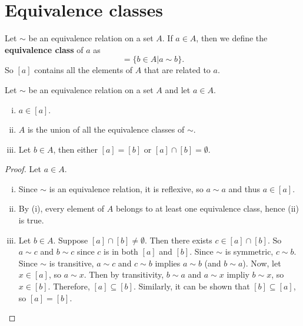 \documentclass[../abstract_algebra.tex]{subfiles}
\begin{document}
    \section{Equivalence classes}
        \begin{definition}
            Let $\sim$ be an equivalence relation on a set $A$.
            If $a\in A$, then we define the \textbf{equivalence class} of $a$ as
            \begin{equation}
                [a]=\{b\in A|a\sim b\}.
            \end{equation}
            So $[a]$ contains all the elements of $A$ that are related to $a$.
        \end{definition}
        \begin{theorem}
            Let $\sim$ be an equivalence relation on a set $A$ and let $a\in A$.
            \begin{enumerate}[(i)]
                \item $a\in[a]$.
                \item $A$ is the union of all the equivalence classes of $\sim$.
                \item Let $b\in A$, then either $[a]=[b]$ or $[a]\cap[b]=\emptyset$.
            \end{enumerate}
        \end{theorem}
        \begin{proof}
            Let $a\in A$.
            \begin{enumerate}[(i)]
                \item Since $\sim$ is an equivalence relation, it is reflexive, so $a\sim a$ and thus $a\in[a]$.
                \item By (i), every element of $A$ belongs to at least one equivalence class, hence (ii) is true.
                \item Let $b\in A$. Suppose $[a]\cap[b]\neq\emptyset$. Then there exists $c\in[a]\cap[b]$.
                So $a\sim c$ and $b\sim c$ since $c$ is in both $[a]$ and $[b]$.
                Since $\sim$ is symmetric, $c\sim b$. Since $\sim$ is transitive, $a\sim c$ and $c\sim b$ implies $a\sim b$ (and $b\sim a$).
                Now, let $x\in[a]$, so $a\sim x$. Then by transitivity, $b\sim a$ and $a\sim x$ impliy $b\sim x$, so $x\in[b]$.
                Therefore, $[a]\subseteq[b]$.
                Similarly, it can be shown that $[b]\subseteq[a]$, so $[a]=[b]$.
            \end{enumerate}
        \end{proof}
\end{document}
